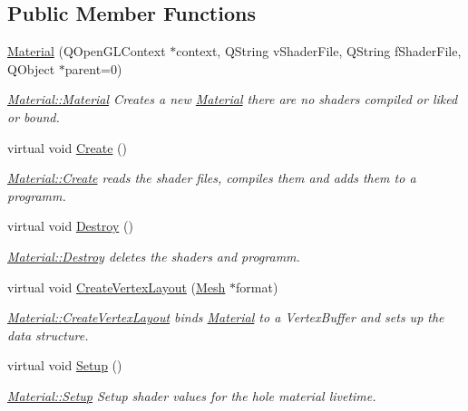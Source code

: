 \subsection*{Public Member Functions}
\begin{DoxyCompactItemize}
\item 
\hyperlink{class_material_a70259ad64e743ee286bddd3bb0389a28}{Material} (Q\+Open\+G\+L\+Context $\ast$context, Q\+String v\+Shader\+File, Q\+String f\+Shader\+File, Q\+Object $\ast$parent=0)
\begin{DoxyCompactList}\small\item\em \hyperlink{class_material_a70259ad64e743ee286bddd3bb0389a28}{Material\+::\+Material} Creates a new \hyperlink{class_material}{Material} there are no shaders compiled or liked or bound. \end{DoxyCompactList}\item 
virtual void \hyperlink{class_material_af39de221a1c5a6ebe920d732e3c84b40}{Create} ()
\begin{DoxyCompactList}\small\item\em \hyperlink{class_material_af39de221a1c5a6ebe920d732e3c84b40}{Material\+::\+Create} reads the shader files, compiles them and adds them to a programm. \end{DoxyCompactList}\item 
virtual void \hyperlink{class_material_aeee87ae4ec3829e9e32119f557c59753}{Destroy} ()
\begin{DoxyCompactList}\small\item\em \hyperlink{class_material_aeee87ae4ec3829e9e32119f557c59753}{Material\+::\+Destroy} deletes the shaders and programm. \end{DoxyCompactList}\item 
virtual void \hyperlink{class_material_a8eff0925974e755d3a9a216a8063c3de}{Create\+Vertex\+Layout} (\hyperlink{class_mesh}{Mesh} $\ast$format)
\begin{DoxyCompactList}\small\item\em \hyperlink{class_material_a8eff0925974e755d3a9a216a8063c3de}{Material\+::\+Create\+Vertex\+Layout} binds \hyperlink{class_material}{Material} to a Vertex\+Buffer and sets up the data structure. \end{DoxyCompactList}\item 
virtual void \hyperlink{class_material_a031a68217b55fb3c46a01757c58eb836}{Setup} ()
\begin{DoxyCompactList}\small\item\em \hyperlink{class_material_a031a68217b55fb3c46a01757c58eb836}{Material\+::\+Setup} Setup shader values for the hole material livetime. \end{DoxyCompactList}\item 

\end{DoxyCompactItemize}
